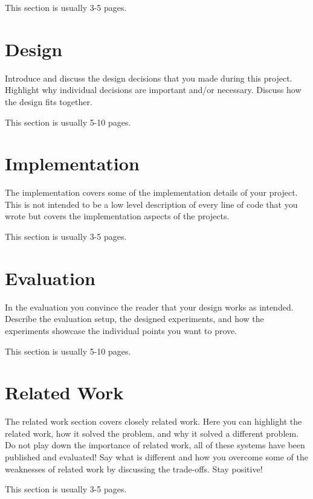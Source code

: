 \documentclass[a4paper,11pt,oneside]{report}
\begin{document}
This section is usually 3-5 pages.


\chapter{Design}

Introduce and discuss the design decisions that you made during this project.
Highlight why individual decisions are important and/or necessary. Discuss
how the design fits together.

This section is usually 5-10 pages.


\chapter{Implementation}

The implementation covers some of the implementation details of your project.
This is not intended to be a low level description of every line of code that
you wrote but covers the implementation aspects of the projects.

This section is usually 3-5 pages.


\chapter{Evaluation}

In the evaluation you convince the reader that your design works as intended.
Describe the evaluation setup, the designed experiments, and how the
experiments showcase the individual points you want to prove.

This section is usually 5-10 pages.


\chapter{Related Work}

The related work section covers closely related work. Here you can highlight
the related work, how it solved the problem, and why it solved a different
problem. Do not play down the importance of related work, all of these
systems have been published and evaluated! Say what is different and how
you overcome some of the weaknesses of related work by discussing the 
trade-offs. Stay positive!

This section is usually 3-5 pages.
\end{document}
